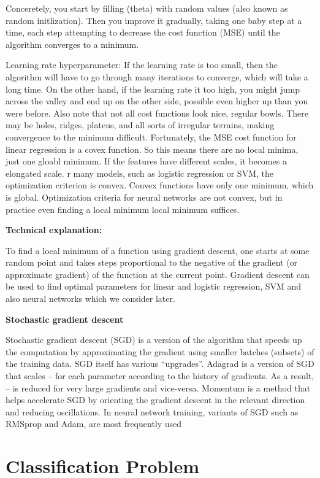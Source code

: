 \documentclass[openany]{book}
\begin{document}
Conceretely, you start by filling (theta) with random values (also known as random initlization). Then you improve it gradually, taking one baby step at a time, each step attempting to decrease the cost function (MSE) until the algorithm converges to a minimum. 

Learning rate hyperparameter: If the learning rate is too small, then the algorithm will have to go through many iterations to converge, which will take a long time. On the other hand, if the learning rate it too high, you might jump across the valley and end up on the other side, possible even higher up than you were before. Also note that not all cost functions look nice, regular bowls. There may be holes, ridges, plateus, and all sorts of irregular terrains, making convergence to the minimum difficult. Fortunately, the MSE cost function for linear regression is a covex function. So this means there are no local minima, just one gloabl minimum. If the features have different scales, it becomes a elongated scale. r many models, such as logistic regression or SVM, the optimization criterion is convex. Convex functions have only one minimum, which is global. Optimization criteria for neural networks are not convex, but in practice even finding a local minimum local minimum suffices.

\textbf{Technical explanation:}
 
To find a local minimum of a function using gradient descent, one starts at some random point and takes steps proportional to the negative of the gradient (or approximate gradient) of the function at the current point. Gradient descent can be used to find optimal parameters for linear and logistic regression, SVM and also neural networks which we consider later. 



\textbf{Stochastic gradient descent}

Stochastic gradient descent (SGD) is a version of the algorithm that speeds up the computation by approximating the gradient using smaller batches (subsets) of the training data. SGD itself has various “upgrades”. Adagrad is a version of SGD that scales – for each parameter according to the history of gradients. As a result, – is reduced for very large gradients and vice-versa. Momentum is a method that helps accelerate SGD by orienting the gradient descent in the relevant direction and reducing oscillations. In neural network training, variants of SGD such as RMSprop and Adam, are most frequently used


\section{Classification Problem}
\end{document}
